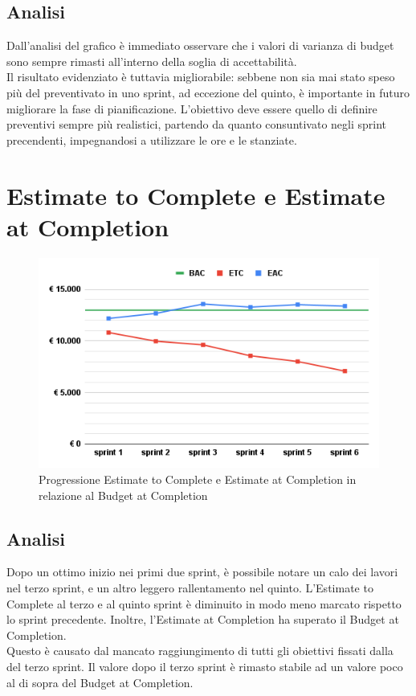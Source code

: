 \subsection{Analisi}
Dall'analisi del grafico è immediato osservare che i valori di varianza di budget sono sempre rimasti all'interno della soglia di accettabilità.\\
Il risultato evidenziato è tuttavia migliorabile: sebbene non sia mai stato speso più del preventivato in uno sprint, ad eccezione del quinto, è importante in futuro migliorare la fase di pianificazione. L'obiettivo deve essere quello di definire preventivi sempre più realistici, partendo da quanto consuntivato negli sprint precendenti, impegnandosi a utilizzare le ore e le  stanziate.

\section{Estimate to Complete e Estimate at Completion}
\begin{figure}[H]
    \centering
    \includegraphics[width=0.8\linewidth]{ETCEAC.png}
    \caption{Progressione Estimate to Complete e Estimate at Completion in relazione al Budget at Completion}
\end{figure}
\subsection{Analisi}
Dopo un ottimo inizio nei primi due sprint, è possibile notare un calo dei lavori nel terzo sprint, e un altro leggero rallentamento nel quinto. L'Estimate to Complete al terzo e al quinto sprint è diminuito in modo meno marcato rispetto lo sprint precedente. Inoltre, l'Estimate at Completion ha superato il Budget at Completion.\\
Questo è causato dal mancato raggiungimento di tutti gli obiettivi fissati dalla  del terzo sprint. Il valore dopo il terzo sprint è rimasto stabile ad un valore poco al di sopra del Budget at Completion.

